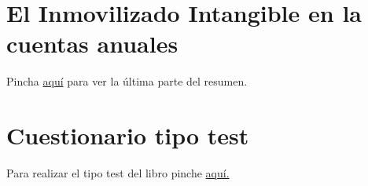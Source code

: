 \documentclass[a4paper,12pt]{article}
\begin{document}
\section{El Inmovilizado Intangible en la cuentas anuales}
Pincha \href{https://github.com/ElblogdeIsmael/ElblogdeIsmael.github.io/blob/main/Asignaturas/Tercer%20A%C3%B1o/CF1/Resumenes/Tema6/ultimaParteT6TeoriaCF1.pdf}{aquí} para ver la última parte del resumen.


\section{Cuestionario tipo test}
Para realizar el tipo test del libro pinche \href{https://elblogdeismael.github.io/Asignaturas/Tercer%20A%C3%B1o/CF1/Tests/testT6Libro.html}{aquí.}
\end{document}
